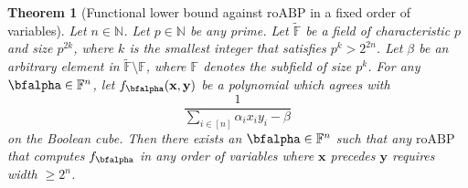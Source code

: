 \documentclass[11pt]{article}
\newtheorem{theorem}{Theorem}[section]
\newtheorem{remark}[theorem]{Remark}
\newcommand{\poly}{\mathop{\mathrm{poly}}}
\newcommand{\F}{\mathbb{F}}
\renewcommand{\comment}[2]{\marginpar{\tiny{\textbf{#1: }\textit{#2}}}}
\newcommand{\nl}[1]{\comment{NL}{#1}}
\newcommand{\vr}[1]{\comment{VR}{#1}}
\newcommand{\IPSLINp}{\mathrm{IPS}_{\mathrm{LIN}'}}
\newcommand{\roABP}{\mathrm{roABP}}
\begin{document}
\begin{theorem}[Functional lower bound against $\roABP$ in a fixed order of variables]\label{thm:roabp-lbd-fixed-order-positive-char}
    Let $n\in \mathbb{N}$. Let $p\in \mathbb{N}$ be any prime. Let $\tilde{\F}$ be a field of characteristic $p$ and size $p^{2k}$, where $k$ is the smallest integer that satisfies $p^k > 2^{2n}$. Let $\beta$ be an arbitrary element in $\tilde{\F}\setminus\F$, where $\F$ denotes the subfield of size $p^k$. For any $\bfalpha \in \F^{n}$, let $f_{\bfalpha}(\mathbf{x},\mathbf{y})$ be a polynomial which agrees with $$\frac{1}{\sum_{i \in [n]}\alpha_{i}x_iy_i - \beta}$$ on the Boolean cube. Then there exists an $\bfalpha \in \F^{n}$ such that any $\roABP$ that computes $f_{\bfalpha}$ in any order of variables where $\mathbf{x}$ precedes $\mathbf{y}$ requires width $\geq 2^n$. 
\end{theorem}

\end{document}

